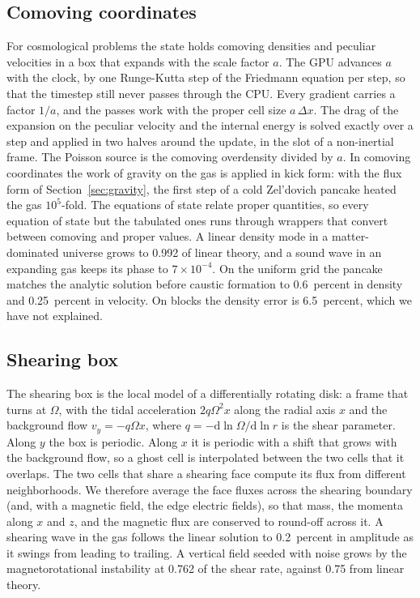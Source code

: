\documentclass[twocolumn]{aastex701}
\begin{document}
\subsection{Comoving coordinates}
\label{sec:comoving}

For cosmological problems the state holds comoving densities and peculiar velocities in a box that expands with the scale factor $a$. The GPU advances $a$ with the clock, by one Runge-Kutta step of the Friedmann equation per step, so that the timestep still never passes through the CPU. Every gradient carries a factor $1/a$, and the passes work with the proper cell size $a\,\Delta x$. The drag of the expansion on the peculiar velocity and the internal energy is solved exactly over a step and applied in two halves around the update, in the slot of a non-inertial frame. The Poisson source is the comoving overdensity divided by $a$. In comoving coordinates the work of gravity on the gas is applied in kick form: with the flux form of Section~\ref{sec:gravity}, the first step of a cold Zel'dovich pancake heated the gas $10^5$-fold. The equations of state relate proper quantities, so every equation of state but the tabulated ones runs through wrappers that convert between comoving and proper values. A linear density mode in a matter-dominated universe grows to 0.992 of linear theory, and a sound wave in an expanding gas keeps its phase to $7\times10^{-4}$. On the uniform grid the pancake matches the analytic solution before caustic formation to 0.6~percent in density and 0.25~percent in velocity. On blocks the density error is 6.5~percent, which we have not explained.

\subsection{Shearing box}
\label{sec:shear}

The shearing box is the local model of a differentially rotating disk: a frame that turns at $\Omega$, with the tidal acceleration $2q\Omega^2 x$ along the radial axis $x$ and the background flow $v_y = -q\Omega x$, where $q = -\mathrm{d}\ln\Omega/\mathrm{d}\ln r$ is the shear parameter. Along $y$ the box is periodic. Along $x$ it is periodic with a shift that grows with the background flow, so a ghost cell is interpolated between the two cells that it overlaps. The two cells that share a shearing face compute its flux from different neighborhoods. We therefore average the face fluxes across the shearing boundary (and, with a magnetic field, the edge electric fields), so that mass, the momenta along $x$ and $z$, and the magnetic flux are conserved to round-off across it. A shearing wave in the gas follows the linear solution to 0.2~percent in amplitude as it swings from leading to trailing. A vertical field seeded with noise grows by the magnetorotational instability at 0.762 of the shear rate, against 0.75 from linear theory.
\end{document}
